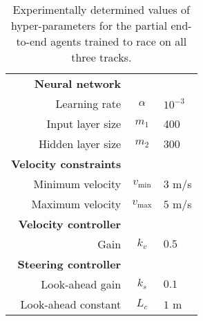 \begin{table}[htb!]
\begin{tabularx}{0.95\textwidth}{RCL}
    \textbf{Neural network}                 &                           & \\
    Learning rate                           & $\alpha$                  & $10^{-3}$ \\
    Input layer size                        & $m_1$                     & 400 \\
    Hidden layer size                       & $m_2$                     & 300 \\
    \textbf{Velocity constraints}           &                           & \\
    Minimum velocity                        & $v_{\text{min}}$          & $3$ m/s \\
    Maximum velocity                        & $v_{\text{max}}$          & $5$ m/s \\
    \textbf{Velocity controller}            &                           & \\
    Gain                                    & $k_{v}$                   & $0.5$ \\
    \textbf{Steering controller}            &                           & \\
    Look-ahead gain                          & $k_{s}$                   & $0.1$ \\
    Look-ahead constant                      & $L_c$                     & $1$ m \\
    \hline
\end{tabularx}
\caption[Values of hyper-parameters for the partial end-to-end racing algorithm]{Experimentally determined values of hyper-parameters for the partial end-to-end agents trained to race on all three tracks.}
\label{tab:pete_values}
\end{table}
